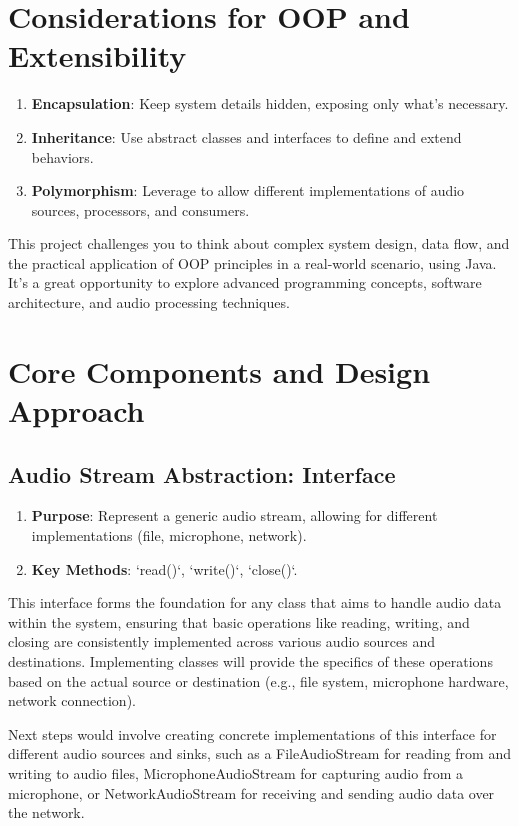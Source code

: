 \documentclass[a4paper,12pt]{article}
\begin{document}
\section{Considerations for OOP and Extensibility}
\begin{enumerate}
  \item \textbf{Encapsulation}: Keep system details hidden, exposing only what's necessary.
  \item \textbf{Inheritance}: Use abstract classes and interfaces to define and extend behaviors.
  \item \textbf{Polymorphism}: Leverage to allow different implementations of audio sources, processors, and consumers.
\end{enumerate}

This project challenges you to think about complex system design,
data flow, and the practical application of OOP principles
in a real-world scenario, using Java.
It's a great opportunity to explore advanced programming concepts,
software architecture, and audio processing techniques.

\section{Core Components and Design Approach}
\subsection{Audio Stream Abstraction: Interface}
\begin{enumerate}
    \item \textbf{Purpose}: Represent a generic audio stream, allowing
    for different implementations (file, microphone, network).
    \item \textbf{Key Methods}: `read()`, `write()`, `close()`.
\end{enumerate}
This interface forms the foundation for any class that aims to handle audio data within the system,
ensuring that basic operations like reading, writing, and closing are consistently implemented across various audio sources and destinations.
Implementing classes will provide the specifics of these operations based on the actual source or destination (e.g., file system, microphone hardware, network connection).

Next steps would involve creating concrete implementations of this interface for different audio sources and sinks,
such as a FileAudioStream for reading from and writing to audio files, MicrophoneAudioStream for capturing audio from a microphone,
or NetworkAudioStream for receiving and sending audio data over the network.
\end{document}
